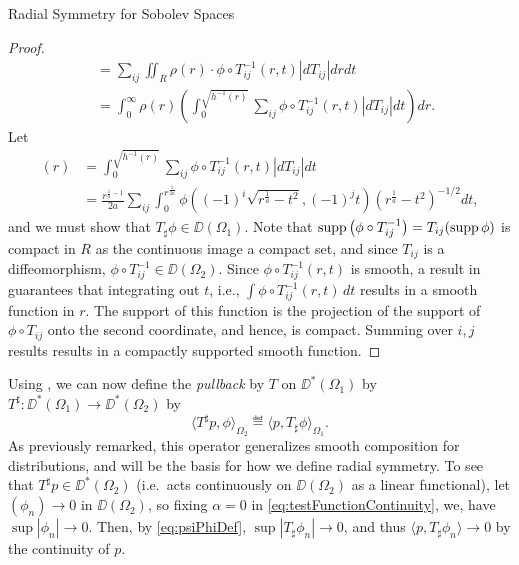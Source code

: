\begin{chapter}{Radial Symmetry for Sobolev Spaces}
\begin{proof}
\begin{align}
    &= \sum_{ij}\iint_{R} \rho(r)\cdot  \phi \circ T_{ij}^{-1}(r,t)\left|dT_{ij}\right|drdt \nonumber \\
    &= \int_0^\infty \rho(r) \left(\int_0^{\sqrt{h^{-1}(r)}} \sum_{ij}\phi \circ T_{ij}^{-1}(r,t)\left|dT_{ij}\right|dt \right)dr \label{eq:phiEquation}.
  \end{align}
  Let 
  \begin{align}
    [T_\sharp\phi](r) 
      &= \int_0^{\sqrt{h^{-1}(r)}} \sum_{ij}\phi \circ T_{ij}^{-1}(r,t)\left|dT_{ij}\right|dt \\
      &= \frac{r^{\frac 1a -1} }{2a}\sum_{ij}\int_0^{r^{\frac{1}{2a}}} \phi \left((-1)^i\sqrt{r^{\frac 1a} - t^2}, (-1)^jt\right) \left( r^{\frac 1a} - t^2 \right)^{-1/2} dt, \label{eq:psiPhiDef}
  \end{align}
  and we must show that $T_\sharp\phi \in \DD(\Omega_1)$.
  Note that $\operatorname*{supp} \left(\phi \circ T_{ij}^{-1} \right) = T_{ij}( \operatorname*{supp} \phi )$ is compact in $R$ as the continuous image a compact set, and since $T_{ij}$ is a diffeomorphism, $\phi \circ T_{ij}^{-1} \in \DD(\Omega_2)$. 
  Since $\phi\circ T_{ij}^{-1}(r,t)$ is smooth, a result in \cite[pg. 433]{strichartz2000} guarantees that integrating out $t$, i.e., $\int \phi \circ T_{ij}^{-1}(r,t)\,dt$ results in a smooth function in $r$.  
  The support of this function is the projection of the support of $\phi\circ T_{ij}$ onto the second coordinate, and hence, is compact.
  Summing over $i,j$ results results in a compactly supported smooth function.

\end{proof}

Using , we can now define the \emph{pullback} by $T$ on $\DD^*(\Omega_1)$ by $T^\sharp:\DD^*(\Omega_1) \to \DD^*(\Omega_2)$ by
\begin{equation}
  \langle T^\sharp p, \phi \rangle_{\Omega_2} \eqdef \langle p, T_\sharp\phi\rangle_{\Omega_1}.
\end{equation}
As previously remarked, this operator generalizes smooth composition for distributions, and will be the basis for how we define radial symmetry.
To see that $T^\sharp p \in \DD^*(\Omega_2)$ (i.e.~acts continuously on $\DD(\Omega_2)$ as a linear functional), let $(\phi_n) \to 0$ in $\DD(\Omega_2)$, so fixing $\alpha = 0$ in \eqref{eq:testFunctionContinuity}, we, have $\sup|\phi_n| \to 0$. 
Then, by \eqref{eq:psiPhiDef}, $\sup |T_\sharp\phi_n| \to 0$, and thus $\langle p, T_\sharp\phi_n\rangle \to 0$ by the continuity of $p$. 


\end{chapter}
